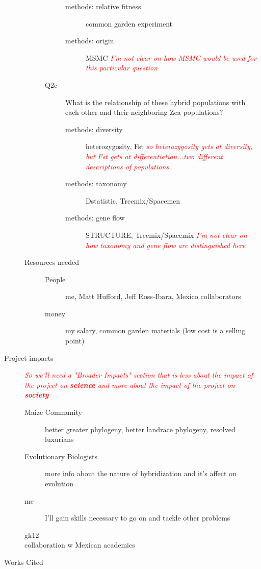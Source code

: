 \documentclass[11pt]{amsart}
\newcommand{\mbh}[1]{\textcolor{red}{ \emph{\scriptsize  #1}} }
\begin{document}
\begin{description}
\begin{description}
\begin{description}
\begin{description}
							\item[methods: relative fitness] common garden experiment
							\item[methods: origin] MSMC \mbh{I'm not clear on how MSMC would be used for this particular question}
						\end{description}
					\item[Q2c] What is the relationship of these hybrid populations with each other and their neighboring Zea populations?
						\begin{description}
							\item[methods: diversity] heterozygosity, Fst \mbh{so heterozygosity gets at diversity, but Fst gets at differentiation...two different descriptions of populations}
							\item[methods: taxonomy] Dstatistic, Treemix/Spacemen
							\item[methods: gene flow] STRUCTURE, Treemix/Spacemix \mbh{I'm not clear on how taxonomy and gene flow are distinguished here}
						\end{description}
				\end{description}
			\item[Resources needed]
				\begin{description}
					\item[People] me, Matt Hufford, Jeff Ross-Ibara, Mexico collaborators
					\item[money] my salary, common garden materials (low cost is a selling point)
				\end{description}
		\end{description}
	\item[Project impacts] \hfill
	\mbh{So we'll need a "Broader Impacts" section that is less about the impact of the project on \textbf{science} and more about the impact of the project on \textbf{society}}
		\begin{description}
			\item[Maize Community] better greater phylogeny, better landrace phylogeny, resolved luxurians
			\item[Evolutionary Biologists] more info about the nature of hybridization and it's affect on evolution
			\item[me] I'll gain skills necessary to go on and tackle other problems
			\item[gk12]
			\item[collaboration w Mexican academics]
		\end{description}
	\item[Works Cited] 
\end{description}
\end{document}

